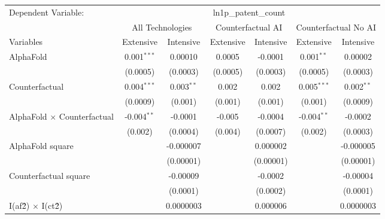 \begingroup
\centering
\begin{tabular}{lcccccc}
   \tabularnewline \midrule \midrule
   Dependent Variable: & \multicolumn{6}{c}{ln1p\_patent\_count}\\
 & \multicolumn{2}{c}{All Technologies} & \multicolumn{2}{c}{Counterfactual AI} & \multicolumn{2}{c}{Counterfactual No AI} \\
\cmidrule(lr){1-1}\cmidrule(lr){2-3} \cmidrule(lr){4-5} \cmidrule(lr){6-7}
Variables & \multicolumn{1}{c}{Extensive} & \multicolumn{1}{c}{Intensive} & \multicolumn{1}{c}{Extensive} & \multicolumn{1}{c}{Intensive} & \multicolumn{1}{c}{Extensive} & \multicolumn{1}{c}{Intensive} \\
\cmidrule(lr){1-1}\cmidrule(lr){2-2} \cmidrule(lr){3-3} \cmidrule(lr){4-4} \cmidrule(lr){5-5} \cmidrule(lr){6-6} \cmidrule(lr){7-7}
   AlphaFold                          & 0.001$^{***}$ & 0.00010      & 0.0005   & -0.0001    & 0.001$^{**}$  & 0.00002\\   
                                      & (0.0005)      & (0.0003)     & (0.0005) & (0.0003)   & (0.0005)      & (0.0003)\\   
   Counterfactual                     & 0.004$^{***}$ & 0.003$^{**}$ & 0.002    & 0.002      & 0.005$^{***}$ & 0.002$^{**}$\\   
                                      & (0.0009)      & (0.001)      & (0.001)  & (0.001)    & (0.001)       & (0.0009)\\   
   AlphaFold $\times$ Counterfactual  & -0.004$^{**}$ & -0.0001      & -0.005   & -0.0004    & -0.004$^{**}$ & -0.0002\\   
                                      & (0.002)       & (0.0004)     & (0.004)  & (0.0007)   & (0.002)       & (0.0003)\\   
   AlphaFold square                   &               & -0.000007    &          & 0.000002   &               & -0.000005\\   
                                      &               & (0.00001)    &          & (0.00001)  &               & (0.00001)\\   
   Counterfactual square              &               & -0.00009     &          & -0.0002    &               & -0.00004\\   
                                      &               & (0.0001)     &          & (0.0002)   &               & (0.0001)\\   
   I(af\^2) $\times$ I(ct\^2)         &               & 0.0000003    &          & 0.000006   &               & 0.0000003\\   

\end{tabular}
